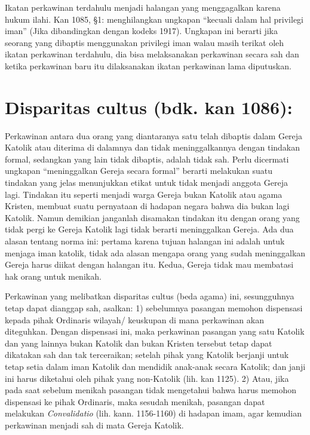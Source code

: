 Ikatan perkawinan terdahulu menjadi halangan yang menggagalkan karena hukum ilahi. Kan 1085, \S1: menghilangkan ungkapan “kecuali dalam hal privilegi iman” (Jika dibandingkan dengan kodeks 1917). Ungkapan ini berarti jika seorang yang dibaptis menggunakan privilegi iman walau masih terikat oleh ikatan perkawinan terdahulu, dia bisa melaksanakan perkawinan secara sah dan ketika perkawinan baru itu dilaksanakan ikatan perkawinan lama diputuskan.

\section{Disparitas cultus (bdk. kan 1086):}

Perkawinan antara dua orang yang diantaranya satu telah dibaptis dalam Gereja Katolik atau diterima di dalamnya dan tidak meninggalkannya dengan tindakan formal, sedangkan yang lain tidak dibaptis, adalah tidak sah. Perlu dicermati ungkapan “meninggalkan Gereja secara formal” berarti melakukan suatu tindakan yang jelas menunjukkan etikat untuk tidak menjadi anggota Gereja lagi. Tindakan itu seperti menjadi warga Gereja bukan Katolik atau agama Kristen, membuat suatu pernyataan di hadapan negara bahwa dia bukan lagi Katolik. Namun demikian janganlah disamakan tindakan itu dengan orang yang tidak pergi ke Gereja Katolik lagi tidak berarti meninggalkan Gereja. Ada dua alasan tentang norma ini: pertama karena tujuan halangan ini adalah untuk menjaga iman katolik, tidak ada alasan mengapa orang yang sudah meninggalkan Gereja harus diikat dengan halangan itu. Kedua, Gereja tidak mau membatasi hak orang untuk menikah.

Perkawinan yang melibatkan disparitas cultus (beda agama) ini, sesungguhnya tetap dapat dianggap sah, asalkan: 1) sebelumnya pasangan memohon dispensasi kepada pihak Ordinaris wilayah/ keuskupan di mana perkawinan akan diteguhkan. Dengan dispensasi ini, maka perkawinan pasangan yang satu Katolik dan yang lainnya bukan Katolik dan bukan Kristen tersebut tetap dapat dikatakan sah dan tak terceraikan; setelah pihak yang Katolik berjanji untuk tetap setia dalam iman Katolik dan mendidik anak-anak secara Katolik; dan janji ini harus diketahui oleh pihak yang non-Katolik (lih. kan 1125). 2) Atau, jika pada saat sebelum menikah pasangan tidak mengetahui bahwa harus memohon dispensasi ke pihak Ordinaris, maka sesudah menikah, pasangan dapat melakukan \textit{Convalidatio} (lih. kann. 1156-1160) di hadapan imam, agar kemudian perkawinan menjadi sah di mata Gereja Katolik.


